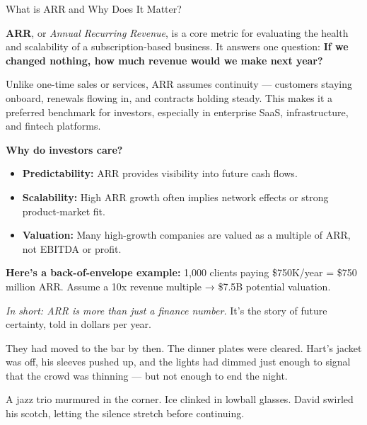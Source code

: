 \begin{TechnicalSidebar}{What is ARR and Why Does It Matter?}

  \textbf{ARR}, or \textit{Annual Recurring Revenue}, is a core metric for evaluating the health and scalability of 
  a subscription-based business.  
  It answers one question: \textbf{If we changed nothing, how much revenue would we make next year?}
  
  \medskip
  
  Unlike one-time sales or services, ARR assumes continuity — customers staying onboard, renewals flowing in, and 
  contracts holding steady.  
  This makes it a preferred benchmark for investors, especially in enterprise SaaS, infrastructure, and 
  fintech platforms.
  
  \medskip
  
  \textbf{Why do investors care?}

  \medskip
  
  \begin{itemize}
    \item \textbf{Predictability:} ARR provides visibility into future cash flows.
    \item \textbf{Scalability:} High ARR growth often implies network effects or strong product-market fit.
    \item \textbf{Valuation:} Many high-growth companies are valued as a multiple of ARR, not EBITDA or profit.
  \end{itemize}
  
  \medskip
  
  \textbf{Here's a back-of-envelope example:}  
  1,000 clients paying \$750K/year = \$750 million ARR.  
  Assume a 10x revenue multiple → \$7.5B potential valuation.
  
  \medskip
  
  \textit{In short: ARR is more than just a finance number.}  
  It’s the story of future certainty, told in dollars per year.
  
\end{TechnicalSidebar}

\medskip

They had moved to the bar by then. The dinner plates were cleared. Hart’s jacket was off, his sleeves pushed up, and the 
lights had dimmed just enough to signal that the crowd was thinning — but not enough to end the night.

A jazz trio murmured in the corner. Ice clinked in lowball glasses. David swirled his scotch, letting the silence stretch 
before continuing.

